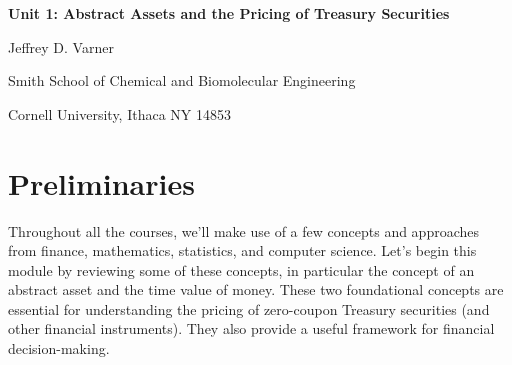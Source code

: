 \documentclass[11pt]{article}
\theoremstyle{definition}
\begin{document}
{\par\centering\textbf{\Large Unit 1: Abstract Assets and the Pricing of Treasury Securities}}
\vspace{0.2in}
{\par \centering \large{Jeffrey D. Varner}}
\vspace{0.05in}
{\par \centering \large{Smith School of Chemical and Biomolecular Engineering}}
{\par \centering \large{Cornell University, Ithaca NY 14853}}

\date{}
\thispagestyle{empty}

\setcounter{page}{1}

\tableofcontents
\clearpage
\listoffigures
\clearpage
\listofalgorithms
\clearpage

\section{Preliminaries}
Throughout all the courses, we'll make use of a few concepts and approaches from finance, mathematics, statistics, and computer science.
Let's begin this module by reviewing some of these concepts, in particular the concept of an abstract asset and the time value of money.
These two foundational concepts are essential for understanding the pricing of zero-coupon Treasury securities (and other financial instruments).
They also provide a useful framework for financial decision-making.
\end{document}
